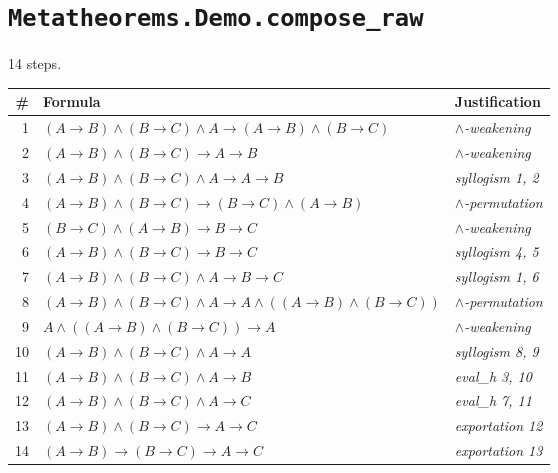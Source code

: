 \section*{\texttt{Metatheorems.Demo.compose\_raw}}
14 steps.

\begin{longtable}{r l l}
\hline
\# & Formula & Justification \\
\hline
\endhead
1 & $(A  \to  B)  \land  (B  \to  C)  \land  A  \to  (A  \to  B)  \land  (B  \to  C)$ & \textit{$\land$-weakening} \\
2 & $(A  \to  B)  \land  (B  \to  C)  \to  A  \to  B$ & \textit{$\land$-weakening} \\
3 & $(A  \to  B)  \land  (B  \to  C)  \land  A  \to  A  \to  B$ & \textit{syllogism 1, 2} \\
4 & $(A  \to  B)  \land  (B  \to  C)  \to  (B  \to  C)  \land  (A  \to  B)$ & \textit{$\land$-permutation} \\
5 & $(B  \to  C)  \land  (A  \to  B)  \to  B  \to  C$ & \textit{$\land$-weakening} \\
6 & $(A  \to  B)  \land  (B  \to  C)  \to  B  \to  C$ & \textit{syllogism 4, 5} \\
7 & $(A  \to  B)  \land  (B  \to  C)  \land  A  \to  B  \to  C$ & \textit{syllogism 1, 6} \\
8 & $(A  \to  B)  \land  (B  \to  C)  \land  A  \to  A  \land  ((A  \to  B)  \land  (B  \to  C))$ & \textit{$\land$-permutation} \\
9 & $A  \land  ((A  \to  B)  \land  (B  \to  C))  \to  A$ & \textit{$\land$-weakening} \\
10 & $(A  \to  B)  \land  (B  \to  C)  \land  A  \to  A$ & \textit{syllogism 8, 9} \\
11 & $(A  \to  B)  \land  (B  \to  C)  \land  A  \to  B$ & \textit{eval\_h 3, 10} \\
12 & $(A  \to  B)  \land  (B  \to  C)  \land  A  \to  C$ & \textit{eval\_h 7, 11} \\
13 & $(A  \to  B)  \land  (B  \to  C)  \to  A  \to  C$ & \textit{exportation 12} \\
14 & $(A  \to  B)  \to  (B  \to  C)  \to  A  \to  C$ & \textit{exportation 13} \\
\hline
\end{longtable}
